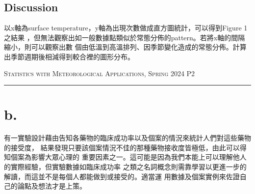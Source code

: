 \documentclass{article}
\begin{document}
\begin{CJK*}{UTF8}{bsmi}
\subsection*{Discussion}
\begin{spacing}{2}
    \begin{large}
        以x軸為surface temperature，y軸為出現次數做成直方圖統計，可以得到Figure 1之結果
        ，但無法觀察出如一般數據點類似於常態分佈的pattern。若將x軸的間隔縮小，則可以觀察出數
        個由低溫到高溫排列、因季節變化造成的常態分佈。計算出季節週期後相減得到較合裡的圖形分布。
    \end{large}
\end{spacing}

\newpage

\thispagestyle{empty}
\hfill {\scshape \large Statistics with Meteorological Applications, Spring 2024} \hfill {\scshape P2}
\smallskip
\hrule
\bigskip
\bigskip
\bigskip

\section*{b.}
\begin{spacing}{2}
    \begin{large}
        有一實驗設計藉由告知各藥物的臨床成功率以及個案的情況來統計人們對這些藥物的接受度，
        結果發現只要該個案情況不佳的那種藥物接收度皆極低，由此可以得知個案為影響大眾心理的
        重要因素之一。這可能是因為我們本能上可以理解他人的實際經驗，但實驗數據如臨床成功率
        之類之名詞概念則需靠學習以更進一步的解讀，而這並不是每個人都能做到或接受的。適當運
        用數據及個案實例來佐證自己的論點及想法才是上策。
    \end{large}
\end{spacing}







\end{CJK*}
\end{document}
